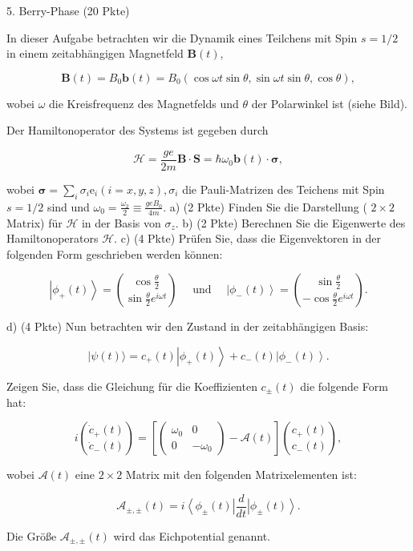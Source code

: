 \documentclass[11pt,a4paper]{article}
\begin{document}
5. Berry-Phase (20 Pkte)

In dieser Aufgabe betrachten wir die Dynamik eines Teilchens mit Spin $s=1 / 2$ in einem zeitabhängigen Magnetfeld $\mathbf{B}(t)$,

$$
\mathbf{B}(t)=B_0 \mathbf{b}(t)=B_0(\cos \omega t \sin \theta, \sin \omega t \sin \theta, \cos \theta),
$$

wobei $\omega$ die Kreisfrequenz des Magnetfelds und $\theta$ der Polarwinkel ist (siehe Bild).

Der Hamiltonoperator des Systems ist gegeben durch

$$
\mathcal{H}=\frac{g e}{2 m} \mathbf{B} \cdot \mathbf{S}=\hbar \omega_0 \mathbf{b}(t) \cdot \boldsymbol{\sigma},
$$

wobei $\boldsymbol{\sigma}=\sum_i \sigma_i \mathrm{e}_i(i=x, y, z), \sigma_i$ die Pauli-Matrizen des
Teichens mit Spin $s=1 / 2$ sind und $\omega_0=\frac{\omega_2}{2} \equiv \frac{g e B_0}{4 m}$.
a) (2 Pkte) Finden Sie die Darstellung ( $2 \times 2$ Matrix) für $\mathcal{H}$ in der Basis von $\sigma_z$.
b) (2 Pkte) Berechnen Sie die Eigenwerte des Hamiltonoperators $\mathcal{H}$.
c) (4 Pkte) Prüfen Sie, dass die Eigenvektoren in der folgenden Form geschrieben werden können:

$$
\left|\phi_{+}(t)\right\rangle=\binom{\cos \frac{\theta}{2}}{\sin \frac{\theta}{2} e^{i \omega t}} \quad \text { und } \quad\left|\phi_{-}(t)\right\rangle=\binom{\sin \frac{\theta}{2}}{-\cos \frac{\theta}{2} e^{i \omega t}} .
$$

d) (4 Pkte) Nun betrachten wir den Zustand in der zeitabhängigen Basis:

$$
|\psi(t)\rangle=c_{+}(t)\left|\phi_{+}(t)\right\rangle+c_{-}(t)\left|\phi_{-}(t)\right\rangle .
$$


Zeigen Sie, dass die Gleichung für die Koeffizienten $c_{ \pm}(t)$ die folgende Form hat:

$$
i\binom{\dot{c}_{+}(t)}{\dot{c}_{-}(t)}=\left[\left(\begin{array}{cc}
\omega_0 & 0 \\
0 & -\omega_0
\end{array}\right)-\mathcal{A}(t)\right]\binom{c_{+}(t)}{c_{-}(t)},
$$

wobei $\mathcal{A}(t)$ eine $2 \times 2$ Matrix mit den folgenden Matrixelementen ist:

$$
\mathcal{A}_{ \pm, \pm}(t)=i\left\langle\phi_{ \pm}(t)\right| \frac{d}{d t}\left|\phi_{ \pm}(t)\right\rangle .
$$


Die Größe $\mathcal{A}_{ \pm, \pm}(t)$ wird das Eichpotential genannt.
\end{document}
